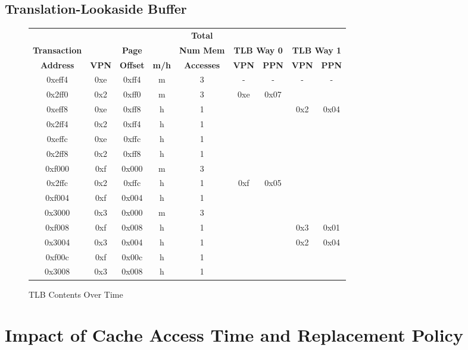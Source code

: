 \documentclass[10pt]{article}
\begin{document}
\subsection{Translation-Lookaside Buffer}
\begin{figure}[H]
\centering
{
\begin{tabular}{@{\extracolsep{3pt}}ccccccccc@{}}
\hline
& & & & \textbf{Total} & & & & \\
\textbf{Transaction} & & \textbf{Page} & & \textbf{Num Mem} & \multicolumn{2}{c}{\textbf{TLB Way 0}} & \multicolumn{2}{c}{\textbf{TLB Way 1}} \\
\cline{6-7}
\cline{8-9}
\textbf{Address} & \textbf{VPN} & \textbf{Offset} & \textbf{m/h} & \textbf{Accesses} & \textbf{VPN} & \textbf{PPN} & \textbf{VPN} & \textbf{PPN} \\
\hline
0xeff4 & 0xe & 0xff4 & m & 3 & - & - & - & - \\
\hline
0x2ff0 & 0x2 & 0xff0 & m & 3 & 0xe & 0x07 & & \\
\hline
0xeff8 & 0xe & 0xff8 & h & 1 &  &  & 0x2 & 0x04 \\
\hline
0x2ff4 & 0x2 & 0xff4 & h & 1 & & & & \\
\hline
0xeffc & 0xe & 0xffc & h & 1 & & & & \\
\hline
0x2ff8 & 0x2 & 0xff8 & h & 1 & & & & \\
\hline
0xf000 & 0xf & 0x000 & m & 3 & & & & \\
\hline
0x2ffc & 0x2 & 0xffc & h & 1 & 0xf & 0x05 & & \\
\hline
0xf004 & 0xf & 0x004 & h & 1 & & & & \\
\hline
0x3000 & 0x3 & 0x000 & m & 3 & & & & \\
\hline
0xf008 & 0xf & 0x008 & h & 1 & & & 0x3 & 0x01 \\
\hline
0x3004 & 0x3 & 0x004 & h & 1 & & & 0x2 & 0x04 \\
\hline
0xf00c & 0xf & 0x00c & h & 1 & & & & \\
\hline
0x3008 & 0x3 & 0x008 & h & 1 & & & & \\
\hline
\end{tabular}
}
\caption{TLB Contents Over Time}
\end{figure}

\cleardoublepage
\section{Impact of Cache Access Time and Replacement Policy}
\end{document}
